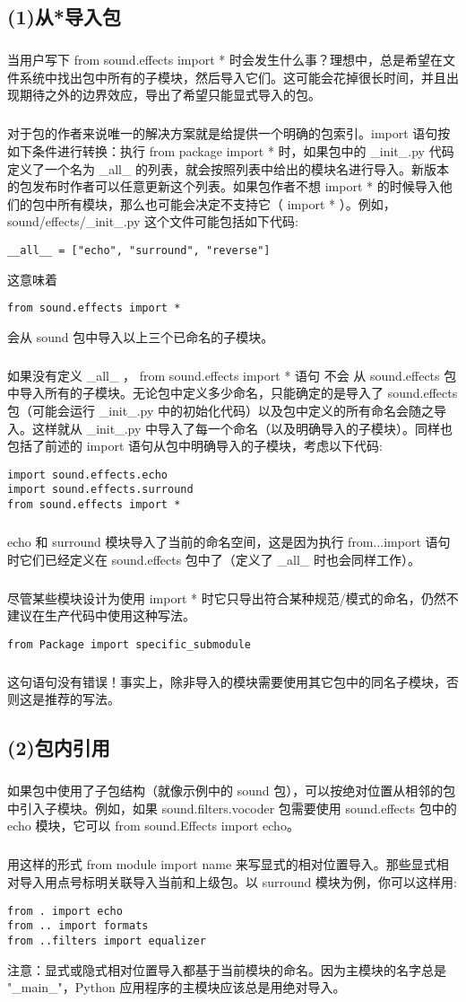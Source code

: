 \documentclass{article}
\begin{document}
\begin{CJK}{UTF8}{gbsn}
\subsection*{(1)从*导入包}
\subparagraph*{}
当用户写下 from sound.effects import * 时会发生什么事？理想中，总是希望在文件系统中找出包中所有的子模块，然后导入它们。这可能会花掉很长时间，并且出现期待之外的边界效应，导出了希望只能显式导入的包。
\subparagraph*{}
对于包的作者来说唯一的解决方案就是给提供一个明确的包索引。import 语句按如下条件进行转换：执行 from package import * 时，如果包中的 \_{}init\_{}.py 代码定义了一个名为 \_{}all\_{} 的列表，就会按照列表中给出的模块名进行导入。新版本的包发布时作者可以任意更新这个列表。如果包作者不想 import * 的时候导入他们的包中所有模块，那么也可能会决定不支持它（ import * ）。例如， sound/effects/\_{}init\_{}.py 这个文件可能包括如下代码:
\begin{verbatim}
__all__ = ["echo", "surround", "reverse"]
\end{verbatim}
这意味着 
\begin{verbatim}
from sound.effects import *
\end{verbatim}
会从 sound 包中导入以上三个已命名的子模块。
\subparagraph*{}
如果没有定义 \_{}all\_{} ， from sound.effects import * 语句 不会 从 sound.effects 包中导入所有的子模块。无论包中定义多少命名，只能确定的是导入了 sound.effects 包（可能会运行 \_{}init\_{}.py 中的初始化代码）以及包中定义的所有命名会随之导入。这样就从 \_{}init\_{}.py 中导入了每一个命名（以及明确导入的子模块）。同样也包括了前述的 import 语句从包中明确导入的子模块，考虑以下代码:
\begin{verbatim}
import sound.effects.echo
import sound.effects.surround
from sound.effects import *
\end{verbatim}
\subparagraph*{}
echo 和 surround 模块导入了当前的命名空间，这是因为执行 from...import 语句时它们已经定义在 sound.effects 包中了（定义了 \_{}all\_{} 时也会同样工作）。
\subparagraph*{}
尽管某些模块设计为使用 import * 时它只导出符合某种规范/模式的命名，仍然不建议在生产代码中使用这种写法。
\begin{verbatim}
from Package import specific_submodule
\end{verbatim}
\subparagraph*{}
这句语句没有错误！事实上，除非导入的模块需要使用其它包中的同名子模块，否则这是推荐的写法。
\subsection*{(2)包内引用}
\subparagraph*{}
如果包中使用了子包结构（就像示例中的 sound 包），可以按绝对位置从相邻的包中引入子模块。例如，如果 sound.filters.vocoder 包需要使用 sound.effects 包中的 echo 模块，它可以 from sound.Effects import echo。
\subparagraph*{}
用这样的形式 from module import name 来写显式的相对位置导入。那些显式相对导入用点号标明关联导入当前和上级包。以 surround 模块为例，你可以这样用:
\begin{verbatim}
from . import echo
from .. import formats
from ..filters import equalizer
\end{verbatim}
注意：显式或隐式相对位置导入都基于当前模块的命名。因为主模块的名字总是 "\_{}main\_{}"，Python 应用程序的主模块应该总是用绝对导入。

\end{CJK}
\end{document}
